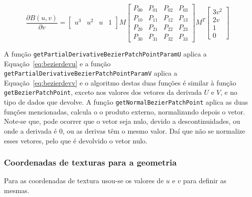 \begin{equation}
	\frac{\partial B(u,v)}{\partial v} = \begin{bmatrix}
       u^{3} & u^{2} & u & 1          \\
		\end{bmatrix}
		M\begin{bmatrix}
		       P_{00} & P_{01} & P_{02} & P_{03}   \\
		       P_{10} & P_{11} & P_{12} & P_{13}   \\
		       P_{20} & P_{21} & P_{22} & P_{23}   \\
		       P_{30} & P_{31} & P_{32} & P_{33}
		     \end{bmatrix}
		M^{T} \begin{bmatrix}
		       3v^{2} \\
		       2v \\
		       1 \\
		       0
		     \end{bmatrix}
\label{eq:bezierdevv}				 
\end{equation}

A função \texttt{getPartialDerivativeBezierPatchPointParamU} aplica
a Equação~\ref{eq:bezierdevu} e a função
\texttt{getPartialDerivativeBezierPatchPointParamV} aplica
a Equação~\ref{eq:bezierdevv} e o algoritmo destas duas funções é similar
à função \texttt{getBezierPatchPoint}, exceto nos valores dos vetores da
derivada $U$ e $V$, e no tipo de dados que devolve. A função
\texttt{getNormalBezierPatchPoint} aplica as duas funções mencionadas, calcula
o o produto externo, normalizando depois o vetor. Note-se que, pode ocorrer que
o vetor seja nulo, devido a descontinuidades, ou onde a derivada é 0, ou as
derivas têm o mesmo valor.
Daí que não se normalize esses vetores, pelo que é devolvido o vetor nulo.

\subsubsection{Coordenadas de texturas para a geometria}

Para as coordenadas de textura usou-se os valores de $u$ e $v$ para definir as
mesmas.
